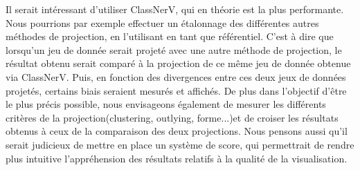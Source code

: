 Il serait intéressant d'utiliser ClassNerV, qui en théorie est la plus performante. Nous pourrions par exemple 
effectuer un étalonnage des différentes autres méthodes de projection, en l'utilisant en tant que référentiel. 
C'est à dire que lorsqu'un jeu de donnée serait projeté avec une autre méthode de projection, le résultat obtenu serait comparé à la projection de ce même jeu de donnée obtenue via ClassNerV.
Puis, en fonction des divergences entre ces deux jeux de données projetés, certains biais seraient mesurés et affichés.
De plus dans l'objectif d'être le plus précis possible, nous envisageons également de mesurer les différents critères de la projection(clustering, outlying, forme...)et de croiser les résultats obtenus à ceux de la comparaison des deux projections.
Nous pensons aussi qu'il serait judicieux de mettre en place un système de score, qui permettrait de rendre plus intuitive l'appréhension des résultats relatifs à la qualité de la visualisation. 

